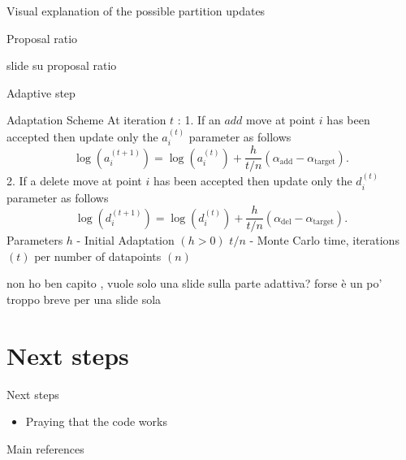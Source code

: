 \begin{frame}{Visual explanation of the possible partition updates}
\end{frame}

\begin{frame}{Proposal ratio}

   slide su proposal ratio

\end{frame}




\begin{frame}{Adaptive step}

Adaptation Scheme
At iteration $t$ :
1. If an $a d d$ move at point $i$ has been accepted then update only the $a_i^{(t)}$ parameter as follows
\[
\log (a_i^{(t+1)})=\log (a_i^{(t)})+\frac{h}{t / n}(\alpha_{\text{add}}-\alpha_{\text{target}}) .
\]
2. If a delete move at point $i$ has been accepted then update only the $d_i^{(t)}$ parameter as follows
\[
\log (d_i^{(t+1)})=\log (d_i^{(t)})+\frac{h}{t / n}(\alpha_{\text{del}}-\alpha_{\text{target}}) .
\]
Parameters
$h$ - Initial Adaptation $(h>0)$
$t / n$ - Monte Carlo time, iterations $(t)$ per number of datapoints $(n)$

   non ho ben capito , vuole solo una slide sulla parte adattiva?
   forse è un po' troppo breve per una slide sola

\end{frame}



\section{Next steps}
\begin{frame}{Next steps}

    \begin{itemize}
        \item Praying that the code works
    \end{itemize}



\end{frame}




\begin{frame}{Main references}
    \nocite{colombiLearningBlockStructured2022a}
    \nocite{mohammadiBayesianStructureLearning2015a}
    \nocite{legramantiExtendedStochasticBlock2022}
    \nocite{bensonAdaptiveMCMCMultiple2018}
    \nocite{martinezNonparametricChangePoint2014}
    
    
    \printbibliography
    \renewcommand*{\bibfont}{\small}
\end{frame}



